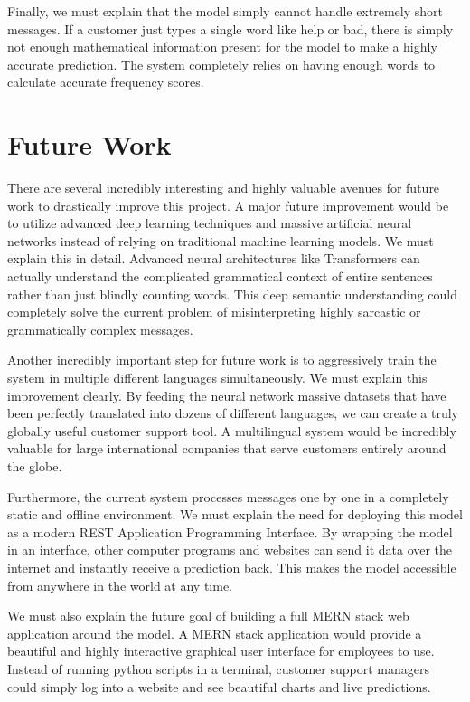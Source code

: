 \documentclass[12pt]{article}
\begin{document}
Finally, we must explain that the model simply cannot handle extremely short messages. If a customer just types a single word like help or bad, there is simply not enough mathematical information present for the model to make a highly accurate prediction. The system completely relies on having enough words to calculate accurate frequency scores.

\section{Future Work}
There are several incredibly interesting and highly valuable avenues for future work to drastically improve this project. A major future improvement would be to utilize advanced deep learning techniques and massive artificial neural networks instead of relying on traditional machine learning models. We must explain this in detail. Advanced neural architectures like Transformers can actually understand the complicated grammatical context of entire sentences rather than just blindly counting words. This deep semantic understanding could completely solve the current problem of misinterpreting highly sarcastic or grammatically complex messages. 

Another incredibly important step for future work is to aggressively train the system in multiple different languages simultaneously. We must explain this improvement clearly. By feeding the neural network massive datasets that have been perfectly translated into dozens of different languages, we can create a truly globally useful customer support tool. A multilingual system would be incredibly valuable for large international companies that serve customers entirely around the globe. 

Furthermore, the current system processes messages one by one in a completely static and offline environment. We must explain the need for deploying this model as a modern REST Application Programming Interface. By wrapping the model in an interface, other computer programs and websites can send it data over the internet and instantly receive a prediction back. This makes the model accessible from anywhere in the world at any time. 

We must also explain the future goal of building a full MERN stack web application around the model. A MERN stack application would provide a beautiful and highly interactive graphical user interface for employees to use. Instead of running python scripts in a terminal, customer support managers could simply log into a website and see beautiful charts and live predictions. 
\end{document}
